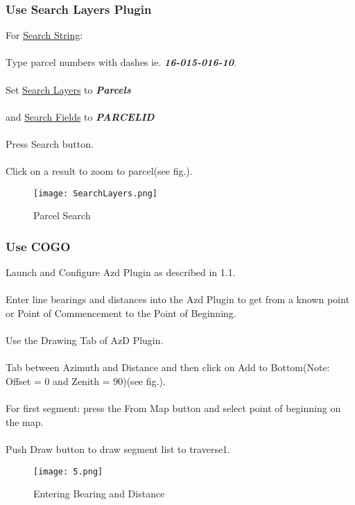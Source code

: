 \documentclass{report}
\begin{document}
\subsubsection{Use Search Layers Plugin}

For \underline{Search String}:\\\\Type parcel numbers with dashes ie. \textbf{\textit{16-015-016-10}}.\\\\Set \underline{Search Layers} to \textbf{\textit{Parcels}}\\\\ and \underline{Search Fields} to \textbf{\textit{PARCELID}}\\\\Press Search button.\\\\Click on a result to zoom to parcel(see fig.).

\begin{figure}[H]
\begin{center}
	\texttt{[image: SearchLayers.png]} 
	\end{center}
	\caption{Parcel Search}
\end{figure}
\pagebreak

\subsubsection{Use COGO}
Launch and Configure Azd Plugin as described in 1.1.\\\\Enter line bearings and distances into the Azd Plugin to get from a known point or Point of Commencement to the Point of Beginning.\\\\Use the Drawing Tab of AzD Plugin.\\\\Tab between Azimuth and Distance and then click on Add to Bottom(Note: Offset = 0 and Zenith = 90)(see fig.).\\\\For first segment: press the From Map button and select point of beginning on the map.\\\\Push Draw button to draw segment list to traverse1.
\begin{figure}[H]
\begin{center}
	\texttt{[image: 5.png]} 
	\end{center}
	\caption{Entering Bearing and Distance}
\end{figure}
\pagebreak
\end{document}
